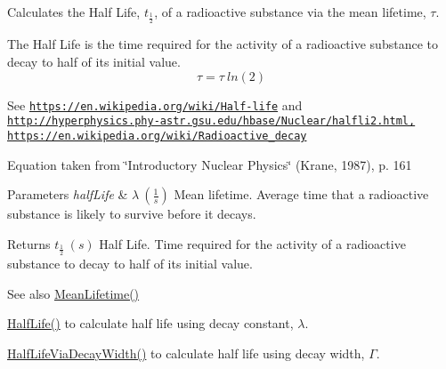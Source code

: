 Calculates the Half Life, $t_{\frac{1}{2}}$, of a radioactive substance via the mean lifetime, $\tau$. 

The Half Life is the time required for the activity of a radioactive substance to decay to half of its initial value. \[\tau= \tau \ ln(2)\]

See \href{https://en.wikipedia.org/wiki/Half-life}{\tt https\+://en.\+wikipedia.\+org/wiki/\+Half-\/life} and \href{http://hyperphysics.phy-astr.gsu.edu/hbase/Nuclear/halfli2.html,}{\tt http\+://hyperphysics.\+phy-\/astr.\+gsu.\+edu/hbase/\+Nuclear/halfli2.\+html,} \href{https://en.wikipedia.org/wiki/Radioactive_decay}{\tt https\+://en.\+wikipedia.\+org/wiki/\+Radioactive\+\_\+decay}

Equation taken from \char`\"{}\+Introductory Nuclear Physics\char`\"{} (Krane, 1987), p. 161


\begin{DoxyParams}{Parameters}
{\em half\+Life} & $\lambda\ (\frac{1}{s})$ Mean lifetime. Average time that a radioactive substance is likely to survive before it decays. \\
\hline
\end{DoxyParams}
\begin{DoxyReturn}{Returns}
$t_{\frac{1}{2}}\ (s)$ Half Life. Time required for the activity of a radioactive substance to decay to half of its initial value. 
\end{DoxyReturn}
\begin{DoxySeeAlso}{See also}
\hyperlink{group___e_g_x_phys-_mean_lifetime_gaa9e3c2deedda4bc7a745568b06fc47eb}{Mean\+Lifetime()} 

\hyperlink{group___e_g_x_phys-_half_life_ga21d268f154fb91c1c556bbfa7fe83ac1}{Half\+Life()} to calculate half life using decay constant, $\lambda$. 

\hyperlink{group___e_g_x_phys-_half_life_gaba3fda944d1a68ee1016a1f2f5809359}{Half\+Life\+Via\+Decay\+Width()} to calculate half life using decay width, $\Gamma$. 
\end{DoxySeeAlso}
